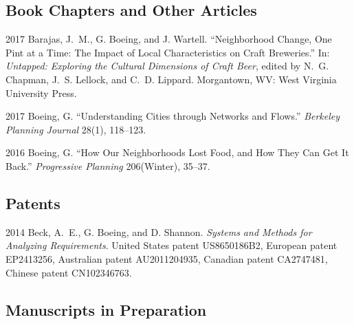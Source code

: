 \documentclass{academiccv}
\begin{document}
\subsection*{Book Chapters and Other Articles}

\begin{tablist}

\item[2017] \tab Barajas, J.~M., G. Boeing, and J. Wartell. \enquote{Neighborhood Change, One Pint at a Time: The Impact of Local Characteristics on Craft Breweries.} In: \emph{Untapped: Exploring the Cultural Dimensions of Craft Beer}, edited by N.~G. Chapman, J.~S. Lellock, and C.~D. Lippard. Morgantown, WV: West Virginia University Press.

\item[2017] \tab Boeing, G. \enquote{Understanding Cities through Networks and Flows.} \emph{Berkeley Planning Journal} 28(1), 118--123.

\item[2016] \tab Boeing, G. \enquote{How Our Neighborhoods Lost Food, and How They Can Get It Back.} \emph{Progressive Planning} 206(Winter), 35--37.

\end{tablist}



\subsection*{Patents}

\begin{tablist}

\item[2014] \tab Beck, A.~E., G. Boeing, and D. Shannon. \emph{Systems and Methods for Analyzing Requirements}. United States patent US8650186B2, European patent EP2413256, Australian patent AU2011204935, Canadian patent CA2747481, Chinese patent CN102346763.

\end{tablist}



\subsection*{Manuscripts in Preparation}
\end{document}
